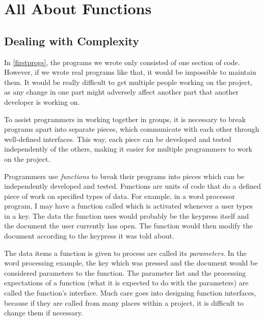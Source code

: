 \chapter{All About Functions}
\label{functionschapter}

% 
% 
% 
% 

\section{Dealing with Complexity}

In \autoref{firstprogs}, the programs we wrote only consisted
of one section of code.  However, if we wrote real programs like that,
it would be impossible to maintain them.  It would be really difficult
to get multiple people working on the project, as any change in one part 
might adversely affect another part that another developer is working on.

To assist programmers in working together in groups, it is necessary
to break programs apart into separate pieces, which communicate with
each other through well-defined interfaces.  This way, each piece can
be developed and tested independently of the others, making it easier
for multiple programmers to work on the project.

Programmers use \emph{functions} to break their programs
into pieces which can be independently developed and tested.  Functions
are units of code that do a defined piece of work on specified types of 
data.  For example, in a word processor program, I may have a function called
 which is activated whenever a
user types in a key.  The data the function uses would probably be the
keypress itself and the document the user currently has open.  The 
function would then modify the document according to the keypress it was 
told about.

The data items a function is given to process are called its 
\emph{parameters}.  In the word processing example, the
key which was pressed and the document would be considered parameters 
to the  function.  The parameter
list and the processing expectations of a function (what it is expected to do
with the parameters) are called the function's interface.  Much care
goes into designing function interfaces, because if they
are called from many places within a project, it is difficult to change
them if necessary.

